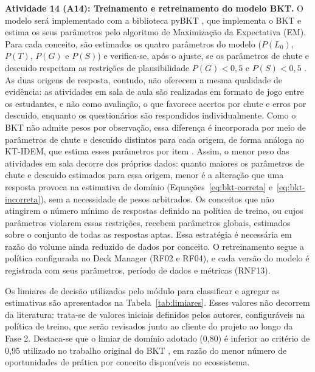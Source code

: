 \textbf{Atividade 14 (A14): Treinamento e retreinamento do modelo BKT.} O modelo será implementado com a biblioteca pyBKT \cite{badrinath_pybkt_2021}, que implementa o BKT e estima os seus parâmetros pelo algoritmo de Maximização da Expectativa (EM). Para cada conceito, são estimados os quatro parâmetros do modelo ($P(L_0)$, $P(T)$, $P(G)$ e $P(S)$) e verifica-se, após o ajuste, se os parâmetros de chute e descuido respeitam as restrições de plausibilidade $P(G) < 0{,}5$ e $P(S) < 0{,}5$ \cite{pelanek_bayesian_2017}. As duas origens de resposta, contudo, não oferecem a mesma qualidade de evidência: as atividades em sala de aula são realizadas em formato de jogo entre os estudantes, e não como avaliação, o que favorece acertos por chute e erros por descuido, enquanto os questionários são respondidos individualmente. Como o BKT não admite pesos por observação, essa diferença é incorporada por meio de parâmetros de chute e descuido distintos para cada origem, de forma análoga ao KT-IDEM, que estima esses parâmetros por item \cite{pardos_kt-idem_2011}. Assim, o menor peso das atividades em sala decorre dos próprios dados: quanto maiores os parâmetros de chute e descuido estimados para essa origem, menor é a alteração que uma resposta provoca na estimativa de domínio (Equações~\ref{eq:bkt-correta} e~\ref{eq:bkt-incorreta}), sem a necessidade de pesos arbitrados. Os conceitos que não atingirem o número mínimo de respostas definido na política de treino, ou cujos parâmetros violarem essas restrições, recebem parâmetros globais, estimados sobre o conjunto de todas as respostas aptas. Essa estratégia é necessária em razão do volume ainda reduzido de dados por conceito. O retreinamento segue a política configurada no Deck Manager (RF02 e RF04), e cada versão do modelo é registrada com seus parâmetros, período de dados e métricas (RNF13).

Os limiares de decisão utilizados pelo módulo para classificar e agregar as estimativas são apresentados na Tabela~\ref{tab:limiares}. Esses valores não decorrem da literatura: trata-se de valores iniciais definidos pelos autores, configuráveis na política de treino, que serão revisados junto ao cliente do projeto ao longo da Fase 2. Destaca-se que o limiar de domínio adotado (0,80) é inferior ao critério de 0,95 utilizado no trabalho original do BKT \cite{corbett_knowledge_1994}, em razão do menor número de oportunidades de prática por conceito disponíveis no ecossistema.

